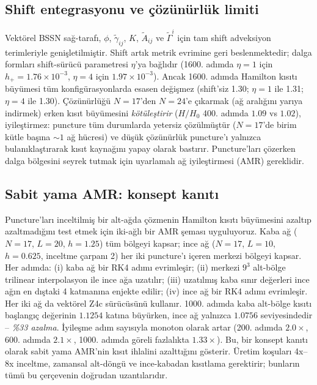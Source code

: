 \subsection{Shift entegrasyonu ve çözünürlük limiti}

Vektörel BSSN sağ-tarafı, $\phi$, $\tilde\gamma_{ij}$, $K$, $\tilde A_{ij}$ ve $\tilde\Gamma^i$ için tam shift adveksiyon terimleriyle genişletilmiştir. Shift artık metrik evrimine geri beslenmektedir; dalga formları shift-sürücü parametresi $\eta$'ya bağlıdır (1600. adımda $\eta=1$ için $h_+ = 1.76 \times 10^{-3}$, $\eta=4$ için $1.97\times 10^{-3}$). Ancak 1600. adımda Hamilton kısıtı büyümesi tüm konfigürasyonlarda esasen değişmez (shift'siz 1.30; $\eta=1$ ile 1.31; $\eta=4$ ile 1.30). Çözünürlüğü $N=17$'den $N=24$'e çıkarmak (ağ aralığını yarıya indirmek) erken kısıt büyümesini \emph{kötüleştirir} ($H/H_0$ 400. adımda $1.09$ vs $1.02$), iyileştirmez: puncture tüm durumlarda yetersiz çözülmüştür ($N=17$'de birim kütle başına $\sim 1$ ağ hücresi) ve düşük çözünürlük puncture'ı yalnızca bulanıklaştırarak kısıt kaynağını yapay olarak bastırır. Puncture'ları çözerken dalga bölgesini seyrek tutmak için uyarlamalı ağ iyileştirmesi (AMR) gereklidir.

\subsection{Sabit yama AMR: konsept kanıtı}

Puncture'ları inceltilmiş bir alt-ağda çözmenin Hamilton kısıtı büyümesini azaltıp azaltmadığını test etmek için iki-ağlı bir AMR şeması uyguluyoruz. Kaba ağ ($N=17$, $L=20$, $h=1.25$) tüm bölgeyi kapsar; ince ağ ($N=17$, $L=10$, $h=0.625$, inceltme çarpanı 2) her iki puncture'ı içeren merkezi bölgeyi kapsar. Her adımda: (i) kaba ağ bir RK4 adımı evrimleşir; (ii) merkezi $9^3$ alt-bölge trilinear interpolasyon ile ince ağa uzatılır; (iii) uzatılmış kaba sınır değerleri ince ağın en dıştaki 4 katmanına enjekte edilir; (iv) ince ağ bir RK4 adımı evrimleşir. Her iki ağ da vektörel Z4c sürücüsünü kullanır. 1000. adımda kaba alt-bölge kısıtı başlangıç değerinin $1.1254$ katına büyürken, ince ağ yalnızca $1.0756$ seviyesindedir -- \emph{\%33 azalma}. İyileşme adım sayısıyla monoton olarak artar (200. adımda $2.0\times$, 600. adımda $2.1\times$, 1000. adımda göreli fazlalıkta $1.33\times$). Bu, bir konsept kanıtı olarak sabit yama AMR'nin kısıt ihlalini azalttığını gösterir. Üretim koşuları 4x--8x inceltme, zamansal alt-döngü ve ince-kabadan kısıtlama gerektirir; bunların tümü bu çerçevenin doğrudan uzantılarıdır.

